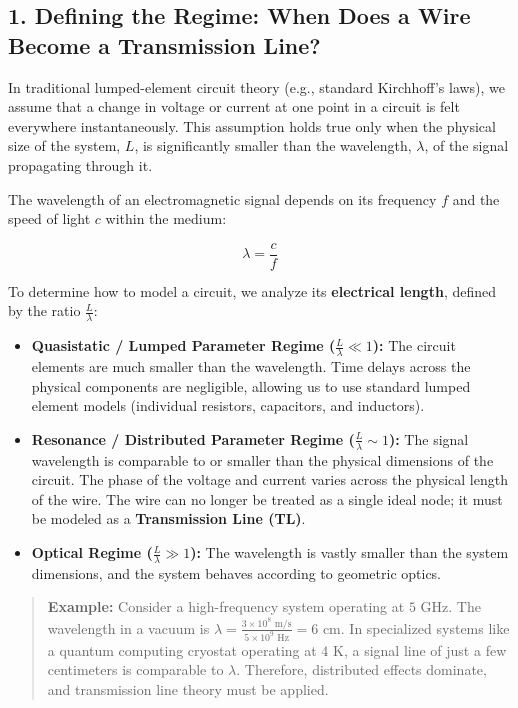 \documentclass[
]{article}
\providecommand{\tightlist}{%
  \setlength{\itemsep}{0pt}\setlength{\parskip}{0pt}}
\begin{document}
\subsection{1. Defining the Regime: When Does a Wire Become a
Transmission
Line?}\label{defining-the-regime-when-does-a-wire-become-a-transmission-line}

In traditional lumped-element circuit theory (e.g., standard Kirchhoff's
laws), we assume that a change in voltage or current at one point in a
circuit is felt everywhere instantaneously. This assumption holds true
only when the physical size of the system, \(L\), is significantly
smaller than the wavelength, \(\lambda\), of the signal propagating
through it.

The wavelength of an electromagnetic signal depends on its frequency
\(f\) and the speed of light \(c\) within the medium:

\[\lambda = \frac{c}{f}\]

To determine how to model a circuit, we analyze its \textbf{electrical
length}, defined by the ratio \(\frac{L}{\lambda}\):

\begin{itemize}
\tightlist
\item
  \textbf{Quasistatic / Lumped Parameter Regime
  (\(\frac{L}{\lambda} \ll 1\)):} The circuit elements are much smaller
  than the wavelength. Time delays across the physical components are
  negligible, allowing us to use standard lumped element models
  (individual resistors, capacitors, and inductors).
\item
  \textbf{Resonance / Distributed Parameter Regime
  (\(\frac{L}{\lambda} \sim 1\)):} The signal wavelength is comparable
  to or smaller than the physical dimensions of the circuit. The phase
  of the voltage and current varies across the physical length of the
  wire. The wire can no longer be treated as a single ideal node; it
  must be modeled as a \textbf{Transmission Line (TL)}.
\item
  \textbf{Optical Regime (\(\frac{L}{\lambda} \gg 1\)):} The wavelength
  is vastly smaller than the system dimensions, and the system behaves
  according to geometric optics.
\end{itemize}

\begin{quote}
\textbf{Example:} Consider a high-frequency system operating at
\(5\text{ GHz}\). The wavelength in a vacuum is
\(\lambda = \frac{3 \times 10^8\text{ m/s}}{5 \times 10^9\text{ Hz}} = 6\text{ cm}\).
In specialized systems like a quantum computing cryostat operating at
\(4\text{ K}\), a signal line of just a few centimeters is comparable to
\(\lambda\). Therefore, distributed effects dominate, and transmission
line theory must be applied.
\end{quote}
\end{document}
